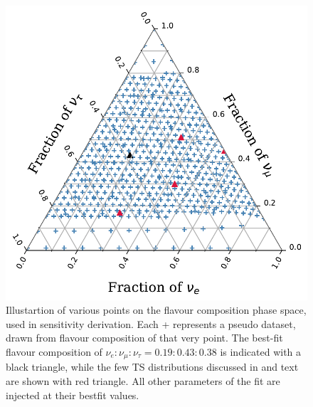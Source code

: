 \begin{figure}[h]
    
    \includegraphics{./figures/results/trials_points.pdf}


    \caption[Illustartion of various points on the flavour composition phase space, used in sensitivity derivation]{Illustartion of various points on the flavour composition phase space, used in sensitivity derivation. Each + represents a pseudo dataset, drawn from flavour composition of that very point. The best-fit flavour composition of $\nu_e:\nu_{\mu}:\nu_{\tau} = 0.19:0.43:0.38$ is indicated with a black triangle, while the few TS distributions discussed in  and text are shown with red triangle. All other parameters of the fit are injected at their bestfit values.}
\end{figure}

